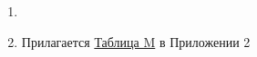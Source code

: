 \begin{enumerate}
    \item {}

    \item Прилагается \hyperlink{tableM}{Таблица M} в Приложении 2
\end{enumerate}